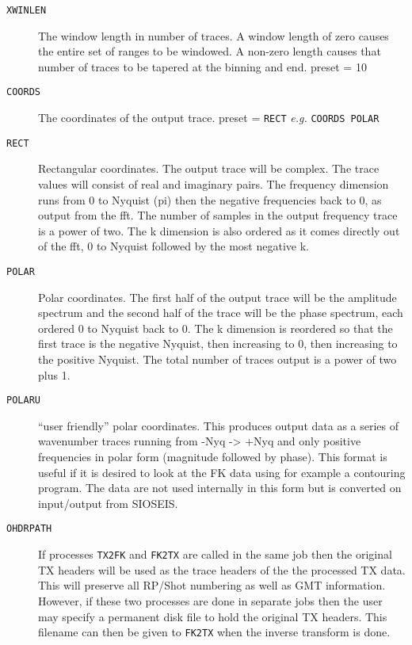 \begin{description}
\item[\texttt{XWINLEN}] The window length in number of traces. A window length of zero
          causes the entire set of ranges to be windowed. A non-zero
          length causes that number of traces to be tapered at the
          binning and end.
          \Gls{preset} = 10

\item[\texttt{COORDS}] The coordinates of the output trace.
         \Gls{preset} = \texttt{RECT}   \textit{e.g.}  \texttt{COORDS POLAR}
\item[\texttt{RECT}] Rectangular coordinates.  The output trace will be complex.
         The trace values will consist of real and imaginary pairs.  The
         frequency dimension runs from 0 to Nyquist (pi) then the
         negative frequencies back to 0, as output from the \gls{fft}.  The
         number of samples in the output frequency trace is a power of
         two.  The k dimension is also ordered as it comes directly out
         of the \gls{fft}, 0 to Nyquist followed by the most negative k.
\item[\texttt{POLAR}] Polar coordinates.  The first half of the output trace
         will be the amplitude spectrum and the second half of the trace
         will be the phase spectrum, each ordered 0 to Nyquist back to 0.
         The k dimension is reordered so that the first trace is the
         negative Nyquist, then increasing to 0, then increasing to the
         positive Nyquist.  The total number of traces output is a power
         of two plus 1.
\item[\texttt{POLARU}] ``user friendly'' polar coordinates. This produces output
         data as a series of wavenumber traces running from -Nyq -> +Nyq
         and only positive frequencies in polar form (magnitude followed
         by phase).  This format is useful if it is desired to look at
         the FK data using for example a contouring program.  The data are
         not used internally in this form but is converted on input/output
         from SIOSEIS.

\item[\texttt{OHDRPATH}] If processes \texttt{TX2FK} and \texttt{FK2TX} are called in the same job then
         the original TX headers will be used as the trace headers of the
         the processed TX data. This will preserve all RP/Shot numbering
         as well as GMT information. However, if these two processes are
         done in separate jobs then the user may specify a permanent disk
         file to hold the original TX headers. This filename can then be
         given to \texttt{FK2TX} when the inverse transform is done.


\end{description}
